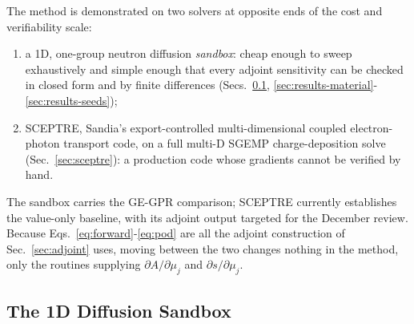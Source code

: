 \documentclass[]{ANStopical}
\begin{document}
The method is demonstrated on two solvers at opposite ends of the cost and verifiability scale:
\begin{enumerate}
    \item a 1D, one-group neutron diffusion \emph{sandbox}: cheap enough to sweep exhaustively and simple enough that every adjoint sensitivity can be checked in closed form and by finite differences (Secs.~\ref{sec:sandbox}, \ref{sec:results-material}-\ref{sec:results-seeds});
    \item SCEPTRE, Sandia's export-controlled multi-dimensional coupled electron-photon transport code, on a full multi-D SGEMP charge-deposition solve (Sec.~\ref{sec:sceptre}): a production code whose gradients cannot be verified by hand.
\end{enumerate}

The sandbox carries the GE-GPR comparison; SCEPTRE currently establishes the value-only baseline, with its adjoint output targeted for the December review. Because Eqs.~\eqref{eq:forward}-\eqref{eq:pod} are all the adjoint construction of Sec.~\ref{sec:adjoint} uses, moving between the two changes nothing in the method, only the routines supplying $\partial A/\partial\mu_j$ and $\partial s/\partial\mu_j$.

\subsection{The 1D Diffusion Sandbox}\label{sec:sandbox}
\end{document}
